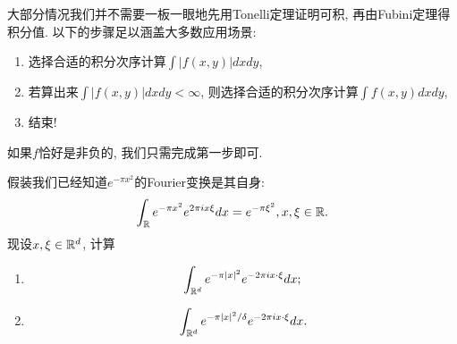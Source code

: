 \begin{remark}
    大部分情况我们并不需要一板一眼地先用Tonelli定理证明可积, 再由Fubini定理得积分值. 以下的步骤足以涵盖大多数应用场景:
    \begin{enumerate}
    \item 选择合适的积分次序计算$\int |f(x,y)|dxdy$,
    \item 若算出来$\int |f(x,y)|dxdy<\infty$, 则选择合适的积分次序计算$\int f(x,y)dxdy$,
    \item 结束!
    \end{enumerate}
    如果$f$恰好是非负的, 我们只需完成第一步即可.
\end{remark}

\begin{exercise}
    假装我们已经知道$e^{-\pi x^2}$的Fourier变换是其自身:
    $$\int_{\mathbb{R}} e^{-\pi x^2}e^{2\pi ix \xi}dx = e^{-\pi \xi^2}, x, \xi \in \mathbb{R}.$$
    现设$x, \xi \in \mathbb{R}^d$, 计算
    \begin{enumerate}
    \item $$\int_{\mathbb{R}^d} e^{-\pi |x|^2}e^{-2\pi i x \cdot \xi}dx;$$
    \item $$\int_{\mathbb{R}^d} e^{-\pi |x|^2 / \delta}e^{-2\pi i x \cdot \xi}dx.$$
    \end{enumerate}
\end{exercise}

